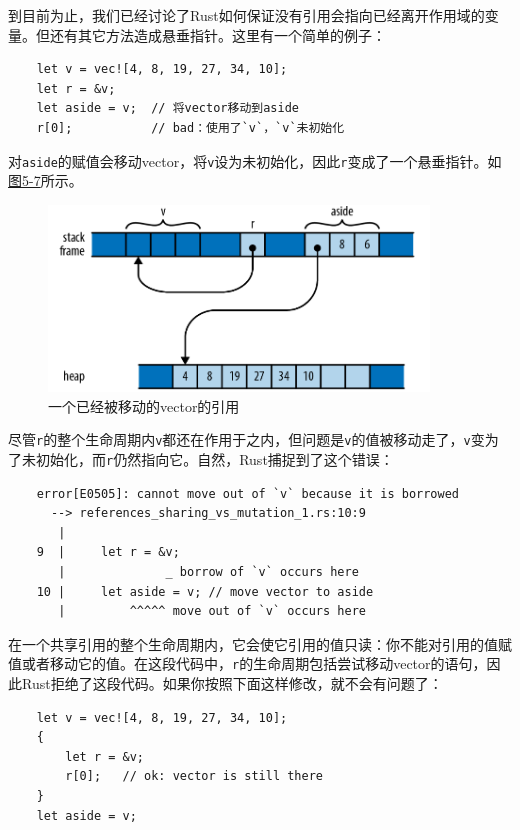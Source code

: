 到目前为止，我们已经讨论了Rust如何保证没有引用会指向已经离开作用域的变量。但还有其它方法造成悬垂指针。这里有一个简单的例子：
\begin{verbatim}
    let v = vec![4, 8, 19, 27, 34, 10];
    let r = &v;
    let aside = v;  // 将vector移动到aside
    r[0];           // bad：使用了`v`，`v`未初始化
\end{verbatim}

对\texttt{aside}的赋值会移动vector，将\texttt{v}设为未初始化，因此\texttt{r}变成了一个悬垂指针。如\hyperref[f5-7]{图5-7}所示。

\begin{figure}[htbp]
    \centering
    \includegraphics[width=0.9\textwidth]{../img/f5-7.png}
    \caption{一个已经被移动的vector的引用}
    \label{f5-7}
\end{figure}

尽管\texttt{r}的整个生命周期内\texttt{v}都还在作用于之内，但问题是\texttt{v}的值被移动走了，\texttt{v}变为了未初始化，而\texttt{r}仍然指向它。自然，Rust捕捉到了这个错误：
\begin{verbatim}
    error[E0505]: cannot move out of `v` because it is borrowed
      --> references_sharing_vs_mutation_1.rs:10:9
       |
    9  |     let r = &v;
       |              _ borrow of `v` occurs here
    10 |     let aside = v; // move vector to aside
       |         ^^^^^ move out of `v` occurs here
\end{verbatim}

在一个共享引用的整个生命周期内，它会使它引用的值只读：你不能对引用的值赋值或者移动它的值。在这段代码中，\texttt{r}的生命周期包括尝试移动vector的语句，因此Rust拒绝了这段代码。如果你按照下面这样修改，就不会有问题了：
\begin{verbatim}
    let v = vec![4, 8, 19, 27, 34, 10];
    {
        let r = &v;
        r[0];   // ok: vector is still there
    }
    let aside = v;
\end{verbatim}

